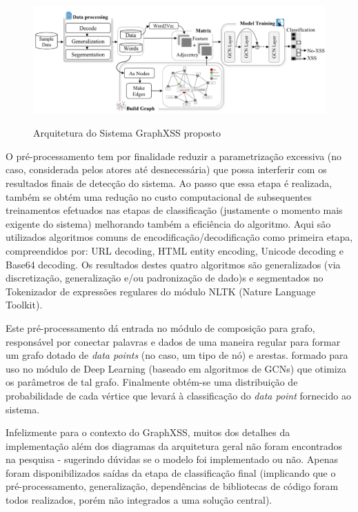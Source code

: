 \begin{figure}[ht]
    \centering
    \caption{Arquitetura do Sistema GraphXSS proposto}
    \includegraphics[width=14cm]{figuras/graphXSS.png} 
    \label{fig:internet} 
\end{figure}

O pré-processamento tem por finalidade reduzir a parametrização excessiva (no caso, considerada pelos atores até desnecessária) que possa interferir com os resultados finais de detecção do sistema. Ao passo que essa etapa é realizada, também se obtém uma redução no custo computacional de subsequentes treinamentos  efetuados nas etapas de classificação (justamente o momento mais exigente do sistema) melhorando também a eficiência do algoritmo. Aqui são utilizados algoritmos comuns de encodificação/decodificação como primeira etapa, compreendidos por: URL decoding, HTML entity encoding, Unicode decoding e Base64 decoding. Os resultados destes quatro algoritmos são generalizados (via discretização, generalização e/ou padronização de dado)s e segmentados no Tokenizador de expressões regulares do módulo NLTK (Nature Language Toolkit).

Este pré-processamento dá entrada no módulo de composição para grafo, responsável por conectar palavras e dados de uma maneira regular para formar um grafo dotado de \textit{data points} (no caso, um tipo de nó) e arestas. formado para uso no módulo de Deep Learning (baseado em algoritmos de GCNs) que otimiza os parâmetros de tal grafo. Finalmente obtém-se uma distribuição de probabilidade de cada vértice que levará à classificação do \textit{data point} fornecido ao sistema. 

Infelizmente para o contexto do GraphXSS, muitos dos detalhes da implementação além dos diagramas da arquitetura geral não foram encontrados na pesquisa - sugerindo dúvidas se o modelo foi implementado ou não. Apenas foram disponibilizados saídas da etapa de classificação final (implicando que o pré-processamento, generalização, dependências de bibliotecas de código foram todos realizados, porém não integrados a uma solução central).

